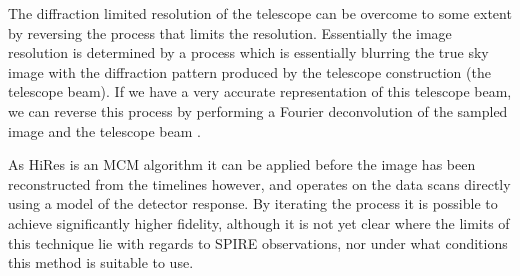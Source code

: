 The diffraction limited resolution of the telescope can be overcome to some extent by reversing the process that limits the resolution. Essentially the image resolution is determined by a process which is essentially blurring the true sky image with the diffraction pattern produced by the telescope construction (the telescope beam). If we have a very accurate representation of this telescope beam, we can reverse this process by performing a Fourier deconvolution of the sampled image and the telescope beam \citep{lucy1974iterative}.

As HiRes is an MCM algorithm it can be applied before the image has been reconstructed from the timelines however, and operates on the data scans directly using a model of the detector response. By iterating the process it is possible to achieve significantly higher fidelity, although it is not yet clear where the limits of this technique lie with regards to SPIRE observations, nor under what conditions this method is suitable to use.
